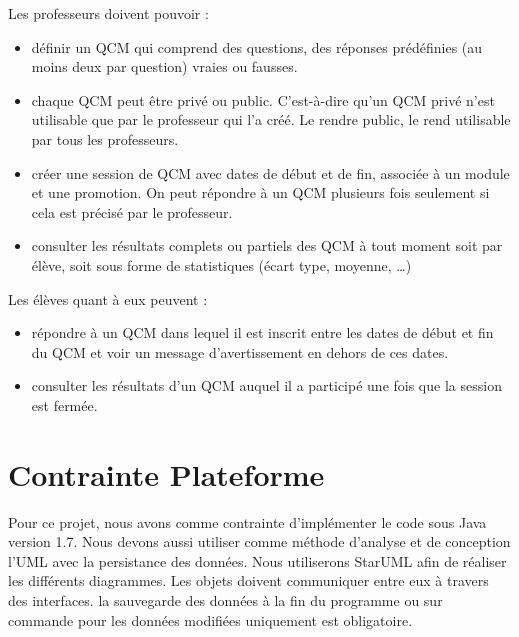 \documentclass[10pt,a4paper,titlepage]{report}
\begin{document}
	Les professeurs doivent pouvoir :
	\begin{itemize}
			\item définir un QCM qui comprend des questions, des réponses prédéfinies (au moins deux par question) vraies ou fausses.

			\item chaque QCM peut être privé ou public. C’est-à-dire qu’un QCM privé n’est utilisable que par le professeur qui l’a créé. Le rendre public, le rend utilisable par tous les professeurs.
			\item créer une session de QCM avec dates de début et de fin, associée à un module et une promotion. On peut répondre à un QCM plusieurs fois seulement si cela est précisé par le professeur.

			\item consulter les résultats complets ou partiels des QCM à tout moment soit par élève, soit sous forme de statistiques (écart type, moyenne, …)

	\end{itemize}
	
	

Les élèves quant à eux peuvent :
\begin{itemize}
	\item répondre à un QCM dans lequel il est inscrit entre les dates de début et fin du QCM et voir un message d’avertissement en dehors de ces dates.
	\item consulter les résultats d’un QCM auquel il a participé une fois que la session est fermée.

\end{itemize}

	\section{Contrainte Plateforme}
		Pour ce projet, nous avons comme contrainte d'implémenter le code sous Java version 1.7. 
		Nous devons aussi utiliser comme méthode d'analyse et de conception l'UML avec la persistance des données. 
Nous utiliserons StarUML afin de réaliser les différents diagrammes. 
Les objets doivent communiquer entre eux à travers des interfaces. 
la sauvegarde des données à la fin du programme ou sur commande pour les données modifiées uniquement est obligatoire.
\end{document}
